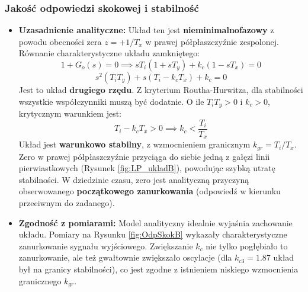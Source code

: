 \documentclass[12pt,a4paper]{article}
\begin{document}
	\subsubsection{Jakość odpowiedzi skokowej i stabilność}
	\begin{itemize}
		\item \textbf{Uzasadnienie analityczne:} Układ ten jest \textbf{nieminimalnofazowy} z powodu obecności zera $z = +1/T_x$ w prawej półpłaszczyźnie zespolonej. Równanie charakterystyczne układu zamkniętego:
		\[
		1 + G_o(s) = 0 \implies sT_i(1 + sT_y) + k_c(1 - sT_x) = 0
		\]
		\[
		s^2(T_i T_y) + s(T_i - k_c T_x) + k_c = 0
		\]
		Jest to układ \textbf{drugiego rzędu}. Z kryterium Routha-Hurwitza, dla stabilności wszystkie współczynniki muszą być dodatnie. O ile $T_i T_y > 0$ i $k_c > 0$, krytycznym warunkiem jest:
		\[
		T_i - k_c T_x > 0 \implies k_c < \frac{T_i}{T_x}
		\]
		Układ jest \textbf{warunkowo stabilny}, z wzmocnieniem granicznym $k_{gr} = T_i / T_x$. Zero w prawej półpłaszczyźnie przyciąga do siebie jedną z gałęzi linii pierwiastkowych (Rysunek \ref{fig:LP_ukladB}), powodując szybką utratę stabilności. W dziedzinie czasu, zero jest analityczną przyczyną obserwowanego \textbf{początkowego zanurkowania} (odpowiedź w kierunku przeciwnym do zadanego).
		
		\item \textbf{Zgodność z pomiarami:} Model analityczny idealnie wyjaśnia zachowanie układu. Pomiary na Rysunku \ref{fig:OdpSkokB} wykazały charakterystyczne zanurkowanie sygnału wyjściowego. Zwiększanie $k_c$ nie tylko pogłębiało to zanurkowanie, ale też gwałtownie zwiększało oscylacje (dla $k_{c3}=1.87$ układ był na granicy stabilności), co jest zgodne z istnieniem niskiego wzmocnienia granicznego $k_{gr}$.
	\end{itemize}
	
\end{document}
